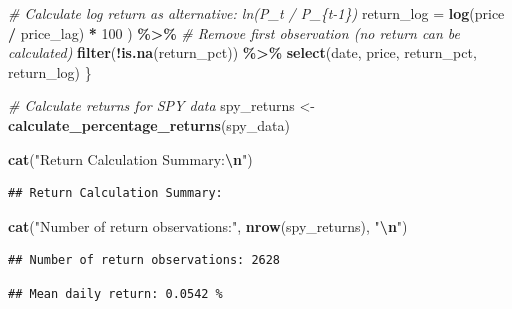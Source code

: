 \documentclass[
]{article}
\newenvironment{Shaded}{\begin{snugshade}}{\end{snugshade}}
\newcommand{\AttributeTok}[1]{\textcolor[rgb]{0.13,0.29,0.53}{#1}}
\newcommand{\CommentTok}[1]{\textcolor[rgb]{0.56,0.35,0.01}{\textit{#1}}}
\newcommand{\DecValTok}[1]{\textcolor[rgb]{0.00,0.00,0.81}{#1}}
\newcommand{\FunctionTok}[1]{\textcolor[rgb]{0.13,0.29,0.53}{\textbf{#1}}}
\newcommand{\NormalTok}[1]{#1}
\newcommand{\OtherTok}[1]{\textcolor[rgb]{0.56,0.35,0.01}{#1}}
\newcommand{\SpecialCharTok}[1]{\textcolor[rgb]{0.81,0.36,0.00}{\textbf{#1}}}
\newcommand{\StringTok}[1]{\textcolor[rgb]{0.31,0.60,0.02}{#1}}
\begin{document}
\begin{Shaded}
\begin{Highlighting}[]
      \CommentTok{\# Calculate log return as alternative: ln(P\_t / P\_\{t{-}1\})}
      \AttributeTok{return\_log =} \FunctionTok{log}\NormalTok{(price }\SpecialCharTok{/}\NormalTok{ price\_lag) }\SpecialCharTok{*} \DecValTok{100}
\NormalTok{    ) }\SpecialCharTok{\%\textgreater{}\%}
    \CommentTok{\# Remove first observation (no return can be calculated)}
    \FunctionTok{filter}\NormalTok{(}\SpecialCharTok{!}\FunctionTok{is.na}\NormalTok{(return\_pct)) }\SpecialCharTok{\%\textgreater{}\%}
    \FunctionTok{select}\NormalTok{(date, price, return\_pct, return\_log)}
\NormalTok{\}}

\CommentTok{\# Calculate returns for SPY data}
\NormalTok{spy\_returns }\OtherTok{\textless{}{-}} \FunctionTok{calculate\_percentage\_returns}\NormalTok{(spy\_data)}

\FunctionTok{cat}\NormalTok{(}\StringTok{"Return Calculation Summary:}\SpecialCharTok{\textbackslash{}n}\StringTok{"}\NormalTok{)}
\end{Highlighting}
\end{Shaded}

\begin{verbatim}
## Return Calculation Summary:
\end{verbatim}

\begin{Shaded}
\begin{Highlighting}[]
\FunctionTok{cat}\NormalTok{(}\StringTok{"Number of return observations:"}\NormalTok{, }\FunctionTok{nrow}\NormalTok{(spy\_returns), }\StringTok{"}\SpecialCharTok{\textbackslash{}n}\StringTok{"}\NormalTok{)}
\end{Highlighting}
\end{Shaded}

\begin{verbatim}
## Number of return observations: 2628
\end{verbatim}

\begin{Shaded}
\end{Shaded}

\begin{verbatim}
## Mean daily return: 0.0542 %
\end{verbatim}
\end{document}

